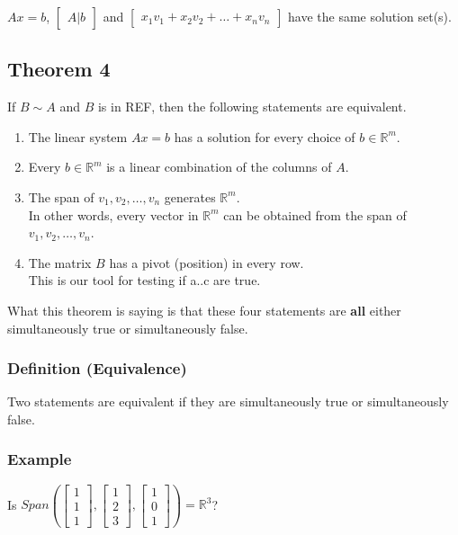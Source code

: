 \documentclass[12pt]{article}
\begin{document}
$Ax=b$, $\begin{bmatrix}A | b\end{bmatrix}$ and 
$\begin{bmatrix} x_1 v_1 + x_2 v_2 + \dots + x_n v_n \end{bmatrix}$ have the same
solution set(s).

\subsection{Theorem 4}
If $B \sim A$ and $B$ is in REF, then the following statements are equivalent.

\begin{enumerate}[label=(\alph*)]
\item The linear system $Ax=b$ has a solution for every choice of $b\in\mathbb{R}^m$.
\item Every $b\in\mathbb{R}^m$ is a linear combination of the columns of $A$.
\item The span of $v_{1}, v_{2}, \dots, v_{n}$ generates $\mathbb{R}^m$.\\
  In other words, every vector in $\mathbb{R}^m$ can be obtained from the span
  of $v_{1}, v_{2}, \dots, v_{n}$.
\item The matrix $B$ has a pivot (position) in every row.\\
  This is our tool for testing if a..c are true.
\end{enumerate}


What this theorem is saying is that these four statements are \textbf{all} either
simultaneously true or simultaneously false.

\subsubsection{Definition (Equivalence)}

Two statements are equivalent if they are simultaneously true or simultaneously
false.

\subsubsection{Example}
\noindent

Is $Span(
\begin{bmatrix}
  1 \\ 1 \\ 1
\end{bmatrix},
\begin{bmatrix}
  1 \\ 2 \\ 3
\end{bmatrix},
\begin{bmatrix}
  1 \\ 0 \\ 1
\end{bmatrix}
) = \mathbb{R}^3$?
\newline
\end{document}
